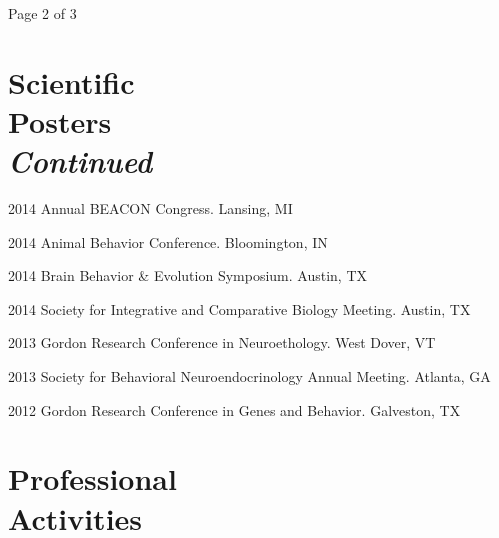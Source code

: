 \documentclass[margin,line]{resume}
\begin{document}
\begin{resume}
\vspace{0.8 cm}
{\centerline {Page 2 of 3}}
\newpage

\section{\mysidestyle Scientific\\Posters\\{\em Continued}}

\begin{list1}
\item[]2014	Annual BEACON Congress. Lansing, MI
\item[]2014	Animal Behavior Conference. Bloomington, IN
\item[]2014	Brain Behavior \& Evolution Symposium. Austin, TX
\item[]2014	Society for Integrative and Comparative Biology Meeting. Austin, TX
\item[]2013	Gordon Research Conference in Neuroethology. West Dover, VT
\item[]2013	Society for Behavioral Neuroendocrinology Annual Meeting. Atlanta, GA
\item[]2012	Gordon Research Conference in Genes and Behavior. Galveston, TX

\end{list1}
    
    
    \section{\mysidestyle Professional\\Activities}


\end{resume}
\end{document}
